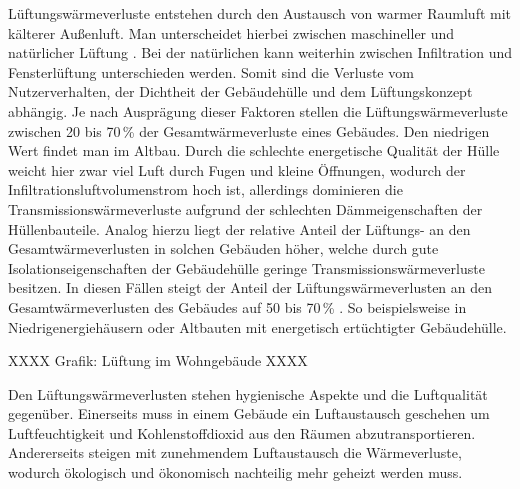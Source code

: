 Lüftungswärmeverluste entstehen durch den Austausch von warmer Raumluft mit kälterer Außenluft.
Man unterscheidet hierbei zwischen maschineller und natürlicher Lüftung \cite{Maas.2017}.
Bei der natürlichen kann weiterhin zwischen Infiltration und Fensterlüftung unterschieden werden.
Somit sind die Verluste vom Nutzerverhalten, der Dichtheit der Gebäudehülle und dem Lüftungskonzept abhängig.
Je nach Ausprägung dieser Faktoren stellen die Lüftungswärmeverluste zwischen 20 bis 70\,\% der Gesamtwärmeverluste eines Gebäudes. 
Den niedrigen Wert findet man im Altbau. 
Durch die schlechte energetische Qualität der Hülle weicht hier zwar viel Luft durch Fugen und kleine Öffnungen, wodurch der Infiltrationsluftvolumenstrom hoch ist, allerdings dominieren die Transmissionswärmeverluste aufgrund der schlechten Dämmeigenschaften der Hüllenbauteile.
Analog hierzu liegt der relative Anteil der Lüftungs- an den Gesamtwärmeverlusten in solchen Gebäuden höher, welche durch gute Isolationseigenschaften der Gebäudehülle geringe Transmissionswärmeverluste besitzen.
In diesen Fällen steigt der Anteil der Lüftungswärmeverlusten an den Gesamtwärmeverlusten des Gebäudes auf 50 bis 70\,\% \cite{Milles.2011}.
So beispielsweise in Niedrigenergiehäusern oder Altbauten mit energetisch ertüchtigter Gebäudehülle. \cite{BorschLaaks.2011}

XXXX Grafik: Lüftung im Wohngebäude XXXX

Den Lüftungswärmeverlusten stehen hygienische Aspekte und die Luftqualität gegenüber.
Einerseits muss in einem Gebäude ein Luftaustausch geschehen um Luftfeuchtigkeit und Kohlenstoffdioxid aus den Räumen abzutransportieren.
Andererseits steigen mit zunehmendem Luftaustausch die Wärmeverluste, wodurch ökologisch und ökonomisch nachteilig mehr geheizt werden muss. 

